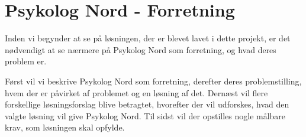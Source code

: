 \section{Psykolog Nord - Forretning}

Inden vi begynder at se på løsningen, der er blevet lavet i dette projekt, er det nødvendigt at se nærmere på Psykolog Nord som forretning, og hvad deres problem er.

Først vil vi beskrive Psykolog Nord som forretning, derefter deres problemstilling, hvem der er påvirket af problemet og en løsning af det.
Dernæst vil flere forskellige løsningsforslag blive betragtet, hvorefter der vil udforskes, hvad den valgte løsning vil give Psykolog Nord.
Til sidst vil der opstilles nogle målbare krav, som løsningen skal opfylde.









